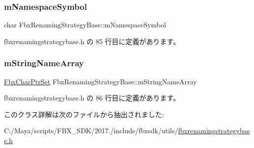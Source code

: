 \subsubsection{\texorpdfstring{m\+Namespace\+Symbol}{mNamespaceSymbol}}
{\footnotesize\ttfamily char Fbx\+Renaming\+Strategy\+Base\+::m\+Namespace\+Symbol}



 fbxrenamingstrategybase.\+h の 85 行目に定義があります。

\mbox{\label{class_fbx_renaming_strategy_base_a4cab3a7e42cbd982adc44841c38b02d0}} 
\subsubsection{\texorpdfstring{m\+String\+Name\+Array}{mStringNameArray}}
{\footnotesize\ttfamily \hyperlink{class_fbx_char_ptr_set}{Fbx\+Char\+Ptr\+Set} Fbx\+Renaming\+Strategy\+Base\+::m\+String\+Name\+Array}



 fbxrenamingstrategybase.\+h の 86 行目に定義があります。



このクラス詳解は次のファイルから抽出されました\+:\begin{DoxyCompactItemize}
\item 
C\+:/\+Maya/scripts/\+F\+B\+X\+\_\+\+S\+D\+K/2017./include/fbxsdk/utils/\hyperlink{fbxrenamingstrategybase_8h}{fbxrenamingstrategybase.\+h}\end{DoxyCompactItemize}
